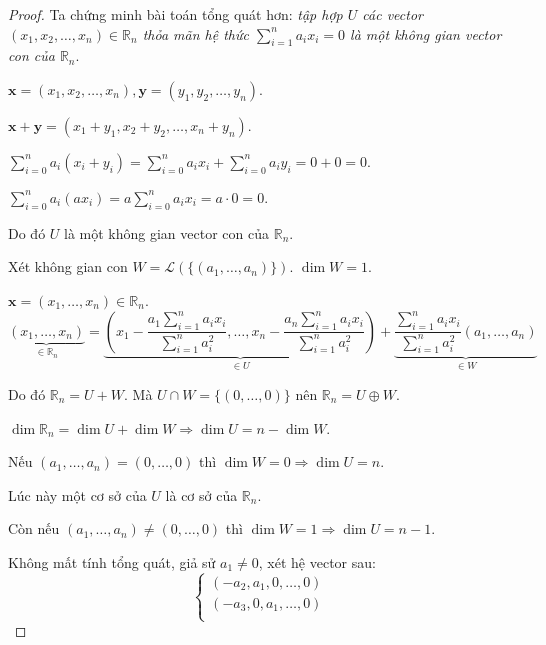 \documentclass[class=linearalgebra,crop=false]{standalone}
\begin{document}
\begin{proof}Ta chứng minh bài toán tổng quát hơn: \textit{tập hợp $U$ các vector $(x_{1}, x_{2}, \ldots, x_{n})\in\mathbb{R}_{n}$ thỏa mãn hệ thức $\displaystyle\sum^{n}_{i=1}a_{i}x_{i} = 0$ là một không gian vector con của $\mathbb{R}_{n}$}.
    \par $\mathbf{x} = (x_{1}, x_{2}, \ldots, x_{n}), \mathbf{y} = (y_{1}, y_{2}, \ldots, y_{n})$.
    \par $\mathbf{x} + \mathbf{y} = (x_{1} + y_{1}, x_{2} + y_{2}, \ldots, x_{n} + y_{n})$.
    \par $\displaystyle\sum^{n}_{i=0}a_{i}(x_{i} + y_{i}) = \displaystyle\sum^{n}_{i=0}a_{i}x_{i} + \displaystyle\sum^{n}_{i=0}a_{i}y_{i} = 0 + 0 = 0$.
    \par $\displaystyle\sum^{n}_{i=0}a_{i}(ax_{i}) = a\displaystyle\sum^{n}_{i=0}a_{i}x_{i} = a\cdot 0 = 0$.
    \par Do đó $U$ là một không gian vector con của $\mathbb{R}_{n}$.
    \par Xét không gian con $W = \mathcal{L}(\{(a_{1},\ldots, a_{n})\})$. $\dim W = 1$.
    \par $\mathbf{x} = (x_{1}, \ldots, x_{n}) \in \mathbb{R}_{n}$.
        \[
            \underbrace{(x_{1},\ldots, x_{n})}_{\in\mathbb{R}_{n}} = \underbrace{\left(x_{1} - \frac{a_{1}\sum^{n}_{i=1} a_{i}x_{i}}{\sum^{n}_{i=1} a^{2}_{i}},\ldots, x_{n} - \frac{a_{n}\sum^{n}_{i=1}a_{i}x_{i}}{\sum^{n}_{i=1}a^{2}_{i}}\right)}_{\in U} + \underbrace{\frac{\sum^{n}_{i=1}a_{i}x_{i}}{\sum^{n}_{i=1}a^{2}_{i}}(a_{1},\ldots,a_{n})}_{\in W}
        \]
    \par Do đó $\mathbb{R}_{n} = U + W$. Mà $U\cap W = \{ (0,\ldots, 0) \}$ nên $\mathbb{R}_{n} = U\oplus W$.
    \par $\dim\mathbb{R}_{n} = \dim U + \dim W \Rightarrow \dim U = n - \dim W$.
    \par Nếu $(a_{1},\ldots, a_{n}) = (0,\ldots,0)$ thì $\dim W = 0 \Rightarrow \dim U = n$.
    \par Lúc này một cơ sở của $U$ là cơ sở của $\mathbb{R}_{n}$.
    \par Còn nếu $(a_{1},\ldots, a_{n}) \ne (0,\ldots,0)$ thì $\dim W = 1\Rightarrow \dim U = n - 1$.
    \par Không mất tính tổng quát, giả sử $a_{1}\ne 0$, xét hệ vector sau:
    \[
        \begin{cases}
            (-a_{2}, a_{1}, 0, \ldots, 0) \\
            (-a_{3}, 0, a_{1}, \ldots, 0) \\

\end{cases}\]
\end{proof}
\end{document}
